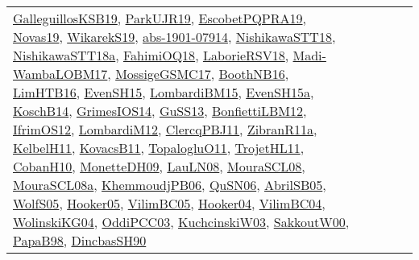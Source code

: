 {\begin{longtable}{lp{3cm}>{\raggedright}p{6cm}>{\raggedright}p{6cm}p{8cm}}
\href{papers/GalleguillosKSB19.pdf}{GalleguillosKSB19}\cite{GalleguillosKSB19}, \href{papers/ParkUJR19.pdf}{ParkUJR19}\cite{ParkUJR19}, \href{articles/EscobetPQPRA19.pdf}{EscobetPQPRA19}\cite{EscobetPQPRA19}, \href{articles/Novas19.pdf}{Novas19}\cite{Novas19}, \href{articles/WikarekS19.pdf}{WikarekS19}\cite{WikarekS19}, \href{articles/abs-1901-07914.pdf}{abs-1901-07914}\cite{abs-1901-07914}, \href{papers/NishikawaSTT18.pdf}{NishikawaSTT18}\cite{NishikawaSTT18}, \href{papers/NishikawaSTT18a.pdf}{NishikawaSTT18a}\cite{NishikawaSTT18a}, \href{articles/FahimiOQ18.pdf}{FahimiOQ18}\cite{FahimiOQ18}, \href{articles/LaborieRSV18.pdf}{LaborieRSV18}\cite{LaborieRSV18}, \href{papers/Madi-WambaLOBM17.pdf}{Madi-WambaLOBM17}\cite{Madi-WambaLOBM17}, \href{papers/MossigeGSMC17.pdf}{MossigeGSMC17}\cite{MossigeGSMC17}, \href{papers/BoothNB16.pdf}{BoothNB16}\cite{BoothNB16}, \href{papers/LimHTB16.pdf}{LimHTB16}\cite{LimHTB16}, \href{papers/EvenSH15.pdf}{EvenSH15}\cite{EvenSH15}, \href{papers/LombardiBM15.pdf}{LombardiBM15}\cite{LombardiBM15}, \href{articles/EvenSH15a.pdf}{EvenSH15a}\cite{EvenSH15a}, \href{papers/KoschB14.pdf}{KoschB14}\cite{KoschB14}, \href{articles/GrimesIOS14.pdf}{GrimesIOS14}\cite{GrimesIOS14}, \href{papers/GuSS13.pdf}{GuSS13}\cite{GuSS13}, \href{papers/BonfiettiLBM12.pdf}{BonfiettiLBM12}\cite{BonfiettiLBM12}, \href{papers/IfrimOS12.pdf}{IfrimOS12}\cite{IfrimOS12}, \href{articles/LombardiM12.pdf}{LombardiM12}\cite{LombardiM12}, \href{papers/ClercqPBJ11.pdf}{ClercqPBJ11}\cite{ClercqPBJ11}, \href{papers/ZibranR11a.pdf}{ZibranR11a}\cite{ZibranR11a}, \href{articles/KelbelH11.pdf}{KelbelH11}\cite{KelbelH11}, \href{articles/KovacsB11.pdf}{KovacsB11}\cite{KovacsB11}, \href{articles/TopalogluO11.pdf}{TopalogluO11}\cite{TopalogluO11}, \href{articles/TrojetHL11.pdf}{TrojetHL11}\cite{TrojetHL11}, \href{papers/CobanH10.pdf}{CobanH10}\cite{CobanH10}, \href{papers/MonetteDH09.pdf}{MonetteDH09}\cite{MonetteDH09}, \href{papers/LauLN08.pdf}{LauLN08}\cite{LauLN08}, \href{papers/MouraSCL08.pdf}{MouraSCL08}\cite{MouraSCL08}, \href{papers/MouraSCL08a.pdf}{MouraSCL08a}\cite{MouraSCL08a}, \href{papers/KhemmoudjPB06.pdf}{KhemmoudjPB06}\cite{KhemmoudjPB06}, \href{papers/QuSN06.pdf}{QuSN06}\cite{QuSN06}, \href{papers/AbrilSB05.pdf}{AbrilSB05}\cite{AbrilSB05}, \href{papers/WolfS05.pdf}{WolfS05}\cite{WolfS05}, \href{articles/Hooker05.pdf}{Hooker05}\cite{Hooker05}, \href{articles/VilimBC05.pdf}{VilimBC05}\cite{VilimBC05}, \href{papers/Hooker04.pdf}{Hooker04}\cite{Hooker04}, \href{papers/VilimBC04.pdf}{VilimBC04}\cite{VilimBC04}, \href{papers/WolinskiKG04.pdf}{WolinskiKG04}\cite{WolinskiKG04}, \href{papers/OddiPCC03.pdf}{OddiPCC03}\cite{OddiPCC03}, \href{articles/KuchcinskiW03.pdf}{KuchcinskiW03}\cite{KuchcinskiW03}, \href{articles/SakkoutW00.pdf}{SakkoutW00}\cite{SakkoutW00}, \href{articles/PapaB98.pdf}{PapaB98}\cite{PapaB98}, \href{articles/DincbasSH90.pdf}{DincbasSH90}\cite{DincbasSH90}\\

\end{longtable}}
